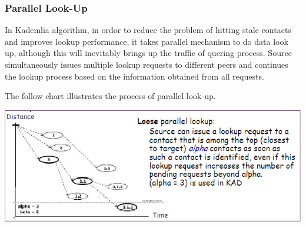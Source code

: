 \subsubsection{Parallel Look-Up}
{
In Kademlia algorithm, in ordor to reduce the problem of hitting stale contacts and improves lookup performance, it takes parallel mechanism to do data look up, although this will inevitably brings up the traffic of quering process.
Source simultaneously issues multiple lookup requests to different peers and continues the lookup process based on the information obtained from all requests.

The follow chart illustrates the process of parallel look-up.
\begin{center}
\includegraphics[width=15cm]{data/ParallelLookup.png}
\end{center}

}

